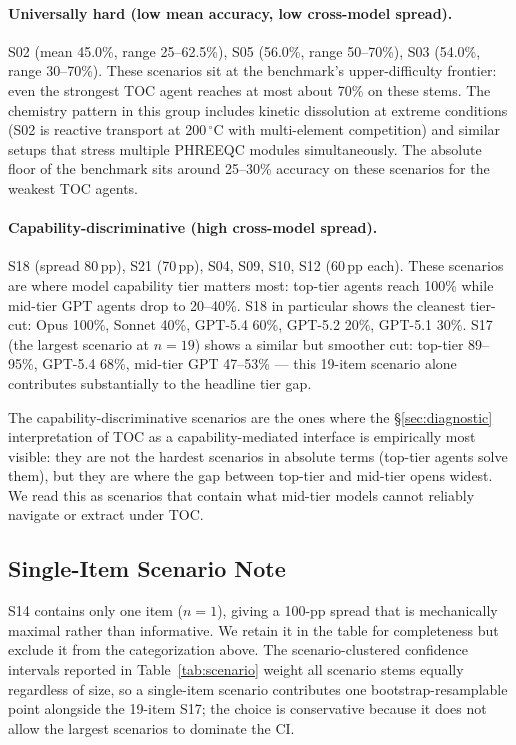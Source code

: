 \documentclass{article}
\begin{document}
\paragraph{Universally hard (low mean accuracy, low cross-model spread).}
S02 (mean 45.0\%, range 25--62.5\%), S05 (56.0\%, range 50--70\%), S03 (54.0\%, range 30--70\%). These scenarios sit at the benchmark's upper-difficulty frontier: even the strongest TOC agent reaches at most about 70\% on these stems. The chemistry pattern in this group includes kinetic dissolution at extreme conditions (S02 is reactive transport at 200\,$^\circ$C with multi-element competition) and similar setups that stress multiple PHREEQC modules simultaneously. The absolute floor of the benchmark sits around 25--30\% accuracy on these scenarios for the weakest TOC agents.

\paragraph{Capability-discriminative (high cross-model spread).}
S18 (spread 80\,pp), S21 (70\,pp), S04, S09, S10, S12 (60\,pp each). These scenarios are where model capability tier matters most: top-tier agents reach 100\% while mid-tier GPT agents drop to 20--40\%. S18 in particular shows the cleanest tier-cut: Opus 100\%, Sonnet 40\%, GPT-5.4 60\%, GPT-5.2 20\%, GPT-5.1 30\%. S17 (the largest scenario at $n=19$) shows a similar but smoother cut: top-tier 89--95\%, GPT-5.4 68\%, mid-tier GPT 47--53\% --- this 19-item scenario alone contributes substantially to the headline tier gap.

The capability-discriminative scenarios are the ones where the §\ref{sec:diagnostic} interpretation of TOC as a capability-mediated interface is empirically most visible: they are not the hardest scenarios in absolute terms (top-tier agents solve them), but they are where the gap between top-tier and mid-tier opens widest. We read this as scenarios that contain what mid-tier models cannot reliably navigate or extract under TOC.

\subsection{Single-Item Scenario Note}

S14 contains only one item ($n=1$), giving a 100-pp spread that is mechanically maximal rather than informative. We retain it in the table for completeness but exclude it from the categorization above. The scenario-clustered confidence intervals reported in Table~\ref{tab:scenario} weight all scenario stems equally regardless of size, so a single-item scenario contributes one bootstrap-resamplable point alongside the 19-item S17; the choice is conservative because it does not allow the largest scenarios to dominate the CI.
\end{document}
